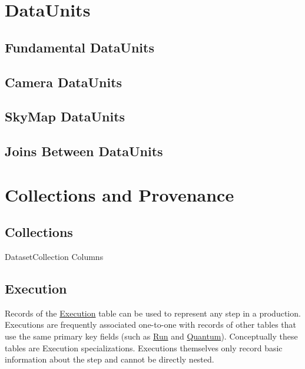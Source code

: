 \documentclass[DM,toc]{lsstdoc}
\newcommand{\tblref}[1]{\hyperref[tbl:#1]{#1}}
\newcommand{\coltable}[1]{
    \begin{table}[!htb]
        {\footnotesize
        }
        \caption{#1 Columns}
        \label{tbl:#1}
    \end{table}
}
\begin{document}
\section{DataUnits}
\label{sec:dataunits}

\subsection{Fundamental DataUnits}
\label{sec:fundamental-dataunits}

\subsection{Camera DataUnits}
\label{sec:camera-dataunits}

\subsection{SkyMap DataUnits}
\label{sec:skymap-dataunits}

\subsection{Joins Between DataUnits}
\label{sec:joins-between-dataunits}


\section{Collections and Provenance}
\label{sec:collections-and-provenance}

\subsection{Collections}
\label{sec:collections}

\coltable{DatasetCollection}

\subsection{Execution}
\label{sec:excution}

Records of the \tblref{Execution} table can be used to represent any step in a production.
Executions are frequently associated one-to-one with records of other tables that use the same primary key fields (such as \hyperref[sec:run]{Run} and \hyperref[sec:quantum]{Quantum}).
Conceptually these tables are Execution specializations.
Executions themselves only record basic information about the step and cannot be directly nested.
\end{document}

